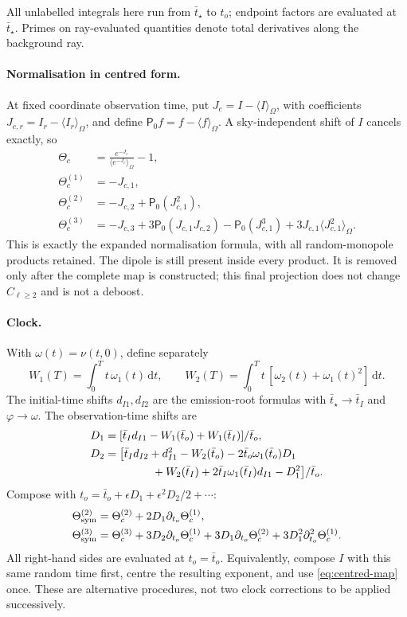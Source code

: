 \documentclass[11pt]{article}
\theoremstyle{definition}
\theoremstyle{remark}
\newcommand{\eps}{\epsilon}
\newcommand{\dd}{\mathrm{d}}
\newcommand{\sky}[1]{\langle #1\rangle_{\Omega}}
\begin{document}
All unlabelled integrals here run from $\bar t_\star$ to $t_o$; endpoint factors are evaluated
at $\bar t_\star$. Primes on ray-evaluated quantities denote total derivatives along the
background ray.

\paragraph{Normalisation in centred form.}
At fixed coordinate observation time, put $J_c=I-\sky{I}$, with coefficients
$J_{c,r}=I_r-\sky{I_r}$, and define $\mathsf P_0f=f-\sky{f}$. A sky-independent shift of
$I$ cancels exactly, so
\begin{equation}\label{eq:centred-map}
\begin{aligned}
\Theta_c&=\frac{e^{-J_c}}{\sky{e^{-J_c}}}-1,\\
\Theta_c^{(1)}&=-J_{c,1},\\
\Theta_c^{(2)}&=-J_{c,2}+\mathsf P_0(J_{c,1}^2),\\
\Theta_c^{(3)}&=-J_{c,3}+3\mathsf P_0(J_{c,1}J_{c,2})
-\mathsf P_0(J_{c,1}^3)+3J_{c,1}\sky{J_{c,1}^2}.
\end{aligned}
\end{equation}
This is exactly the expanded normalisation formula, with all random-monopole products
retained. The dipole is still present inside every product. It is removed only after the
complete map is constructed; this final projection does not change $C_{\ell\ge2}$ and is not
a deboost.

\paragraph{Clock.} With $\omega(t)=\nu(t,0)$, define separately
\[
W_1(T)=\int_0^Tt\,\omega_1(t)\,\dd t,\qquad
W_2(T)=\int_0^Tt\,[\omega_2(t)+\omega_1(t)^2]\,\dd t.
\]
The initial-time shifts $d_{I1},d_{I2}$ are the emission-root formulas with
$\bar t_\star\to\bar t_I$ and $\varphi\to\omega$. The observation-time shifts are
\begin{align*}
D_1&=[\bar t_Id_{I1}-W_1(\bar t_o)+W_1(\bar t_I)]/\bar t_o,\\
D_2&=\big[\bar t_Id_{I2}+d_{I1}^2-W_2(\bar t_o)-2\bar t_o\omega_1(\bar t_o)D_1\\
&\hspace{1.5cm}+W_2(\bar t_I)+2\bar t_I\omega_1(\bar t_I)d_{I1}-D_1^2\big]/\bar t_o.
\end{align*}
Compose with $t_o=\bar t_o+\eps D_1+\eps^2D_2/2+\cdots$:
\begin{align*}
\Theta_{\rm sym}^{(2)}&=\Theta_c^{(2)}+2D_1\partial_{t_o}\Theta_c^{(1)},\\
\Theta_{\rm sym}^{(3)}&=\Theta_c^{(3)}+3D_2\partial_{t_o}\Theta_c^{(1)}
+3D_1\partial_{t_o}\Theta_c^{(2)}+3D_1^2\partial_{t_o}^2\Theta_c^{(1)}.
\end{align*}
All right-hand sides are evaluated at $t_o=\bar t_o$. Equivalently, compose $I$ with this
same random time first, centre the resulting exponent, and use \eqref{eq:centred-map} once.
These are alternative procedures, not two clock corrections to be applied successively.
\end{document}
